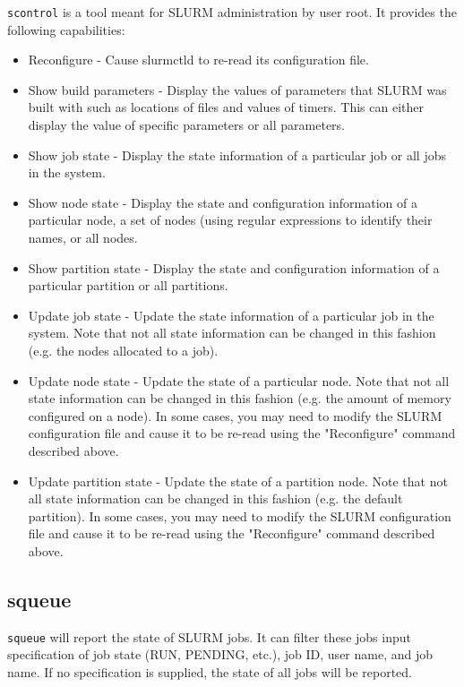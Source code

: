 {\tt scontrol} is a tool meant for SLURM administration by user root. 
It provides the following capabilities:
\begin{itemize}
\item Reconfigure - Cause slurmctld to re-read its configuration file.
\item Show build parameters - Display the values of parameters that SLURM 
was built with such as locations of files and values of timers. This can 
either display the value of specific parameters or all parameters.
\item Show job state - Display the state information of a particular job 
or all jobs in the system.
\item Show node state - Display the state and configuration information 
of a particular node, a set of nodes (using regular expressions to 
identify their names, or all nodes.
\item Show partition state - Display the state and configuration information 
of a particular partition or all partitions.
\item Update job state - Update the state information of a particular job 
in the system. Note that not all state information can be changed in this 
fashion (e.g. the nodes allocated to a job).
\item Update node state - Update the state of a particular node. Note that 
not all state information can be changed in this fashion (e.g. the amount 
of memory configured on a node). In some cases, you may need to modify 
the SLURM configuration file and cause it to be re-read using the "Reconfigure" 
command described above.
\item Update partition state - Update the state of a partition node. Note that 
not all state information can be changed in this fashion (e.g. the default 
partition). In some cases, you may need to modify the SLURM configuration 
file and cause it to be re-read using the "Reconfigure" command described above.
\end{itemize}

\subsection{squeue}

{\tt squeue} will report the state of SLURM jobs. 
It can filter these jobs input specification of job state (RUN, PENDING, etc.), 
job ID, user name, and job name. 
If no specification is supplied, the state of all jobs will be reported.

